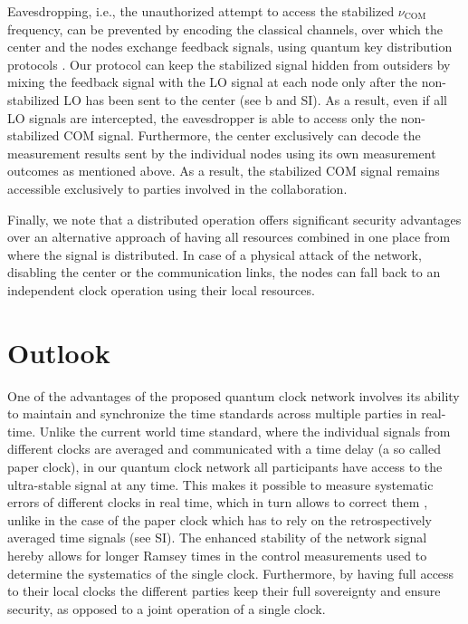 Eavesdropping, i.e., the unauthorized attempt to access the stabilized
$\nu_\mathrm{COM}$ frequency, can be prevented by encoding the classical channels,
over which the center and the nodes exchange feedback signals, using quantum key
distribution protocols \cite{Gisin2002}. Our protocol can keep the stabilized
signal hidden from outsiders by mixing the feedback signal with the LO signal at each node only
after the non-stabilized LO has been sent to the center (see
b and SI). As a result, even if  all LO signals are intercepted, the eavesdropper is able to access
only the non-stabilized COM signal. Furthermore, the center exclusively can decode the
measurement results sent by the individual nodes using its own measurement outcomes as mentioned above. 
As a result, the stabilized COM signal remains
accessible exclusively to parties involved in the collaboration.

Finally, we note that a distributed operation offers significant security
advantages over an alternative approach of having all resources combined in one
place from where the signal is distributed. In case of a physical attack of the
network, disabling the center or the communication links, the nodes can fall
back to an independent clock operation using their local resources.

\section{Outlook}

One of the advantages of the proposed quantum clock network involves its ability
to maintain and synchronize the time standards across multiple parties in
real-time. 
Unlike the current world time standard, where the individual signals from
different clocks are averaged and communicated with a time delay (a so called
paper clock), in our quantum clock network all participants have access to the
ultra-stable signal at any time.
This makes it possible to measure systematic errors of different clocks in
real time, which in turn allows to correct them \cite{Bloom2013}, unlike in the
case of the paper clock which has to rely on the retrospectively averaged time 
signals (see SI). 
The enhanced stability of the network signal hereby allows for longer Ramsey
times in the control measurements used to determine the systematics of the
single clock.
Furthermore, by having full access to their local clocks the different parties
keep  their full sovereignty and ensure security, as opposed to a joint
operation of a single clock.

